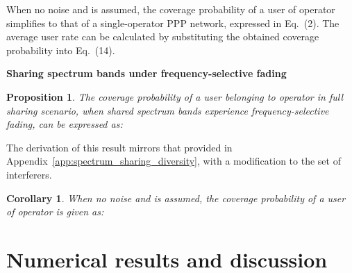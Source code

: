 \documentclass[12pt, journal,doublecolumn, final]{IEEEtran}
\newcommand{\App}[1]{Appendix~\ref{app:#1}}
\newtheorem{proposition}{Proposition}
\newtheorem{corollary}{Corollary}
\begin{document}
When no noise and  is assumed, the coverage probability of a user of operator  simplifies to that of a single-operator \ac{PPP} network, expressed in Eq.~(2). The average user rate can be calculated by substituting the obtained coverage probability into Eq.~(14). 

\noindent
{\bf Sharing spectrum bands under frequency-selective fading}

\begin{proposition}
The coverage probability of a user belonging to operator  in full sharing scenario, when shared spectrum bands experience frequency-selective fading, can be expressed as:

\end{proposition}

\begin{IEEEproof}
The derivation of this result mirrors that provided in \App{spectrum_sharing_diversity}, with a modification to the set of interferers.
\end{IEEEproof}

\begin{corollary}
When no noise and  is assumed, the coverage probability of a user of operator  is given as:

\label{cor:cp_ppp_full_nadj_exp_nonoise_a4_div}
\end{corollary}

\section{Numerical results and discussion}
\label{sec:results}
\end{document}
